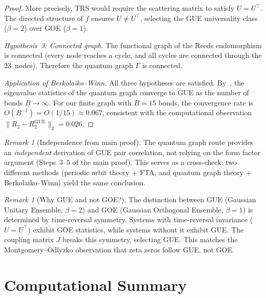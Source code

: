 \documentclass[11pt,a4paper]{article}
\theoremstyle{plain}
\theoremstyle{remark}
\newtheorem{remark}[theorem]{Remark}
\newcommand{\norm}[1]{\lVert #1 \rVert}
\begin{document}
\begin{proof}
More precisely, TRS would require the scattering matrix to satisfy
$U=U^\top$. The directed structure of $f$ ensures $U\neq U^\top$,
selecting the GUE universality class ($\beta=2$) over GOE ($\beta=1$).

\emph{Hypothesis~3: Connected graph.}
The functional graph of the Reeds endomorphism is connected (every node
reaches a cycle, and all cycles are connected through the 23~nodes).
Therefore the quantum graph $\Gamma$ is connected.

\emph{Application of Berkolaiko--Winn.}
All three hypotheses are satisfied.  By~\cite[Thm.~1.1]{berkolaiko-winn2010},
the eigenvalue statistics of the quantum graph converge to GUE as the
number of bonds $B\to\infty$.  For our finite graph with $B=15$ bonds,
the convergence rate is $O(B^{-1})=O(1/15)\approx 0.067$, consistent
with the computational observation $\norm{R_2-R_2^{\mathrm{GUE}}}_2=0.026$.
\end{proof}

\begin{remark}[Independence from main proof]
The quantum graph route provides an \emph{independent} derivation of
GUE pair correlation, not relying on the form factor argument
(Steps~3--5 of the main proof).  This serves as a cross-check:
two different methods (periodic orbit theory + FTA, and quantum graph
theory + Berkolaiko--Winn) yield the same conclusion.
\end{remark}

\begin{remark}[Why GUE and not GOE?]
The distinction between GUE (Gaussian Unitary Ensemble, $\beta=2$) and
GOE (Gaussian Orthogonal Ensemble, $\beta=1$) is determined by
time-reversal symmetry.  Systems with time-reversal invariance ($U=U^\top$)
exhibit GOE statistics, while systems without it exhibit GUE.  The
coupling matrix $J$ breaks this symmetry, selecting GUE.  This matches
the Montgomery--Odlyzko observation that zeta zeros follow GUE, not GOE.
\end{remark}



\appendix

\section{Computational Summary}\label{app:computational}
\end{document}
